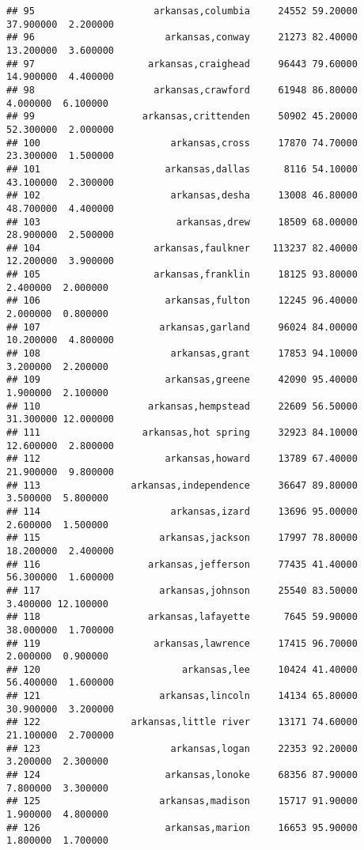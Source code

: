 \documentclass[
]{article}
\begin{document}
\begin{verbatim}
## 95                     arkansas,columbia     24552 59.20000 37.900000  2.200000
## 96                       arkansas,conway     21273 82.40000 13.200000  3.600000
## 97                    arkansas,craighead     96443 79.60000 14.900000  4.400000
## 98                     arkansas,crawford     61948 86.80000  4.000000  6.100000
## 99                   arkansas,crittenden     50902 45.20000 52.300000  2.000000
## 100                       arkansas,cross     17870 74.70000 23.300000  1.500000
## 101                      arkansas,dallas      8116 54.10000 43.100000  2.300000
## 102                       arkansas,desha     13008 46.80000 48.700000  4.400000
## 103                        arkansas,drew     18509 68.00000 28.900000  2.500000
## 104                    arkansas,faulkner    113237 82.40000 12.200000  3.900000
## 105                    arkansas,franklin     18125 93.80000  2.400000  2.000000
## 106                      arkansas,fulton     12245 96.40000  2.000000  0.800000
## 107                     arkansas,garland     96024 84.00000 10.200000  4.800000
## 108                       arkansas,grant     17853 94.10000  3.200000  2.200000
## 109                      arkansas,greene     42090 95.40000  1.900000  2.100000
## 110                   arkansas,hempstead     22609 56.50000 31.300000 12.000000
## 111                  arkansas,hot spring     32923 84.10000 12.600000  2.800000
## 112                      arkansas,howard     13789 67.40000 21.900000  9.800000
## 113                arkansas,independence     36647 89.80000  3.500000  5.800000
## 114                       arkansas,izard     13696 95.00000  2.600000  1.500000
## 115                     arkansas,jackson     17997 78.80000 18.200000  2.400000
## 116                   arkansas,jefferson     77435 41.40000 56.300000  1.600000
## 117                     arkansas,johnson     25540 83.50000  3.400000 12.100000
## 118                   arkansas,lafayette      7645 59.90000 38.000000  1.700000
## 119                    arkansas,lawrence     17415 96.70000  2.000000  0.900000
## 120                         arkansas,lee     10424 41.40000 56.400000  1.600000
## 121                     arkansas,lincoln     14134 65.80000 30.900000  3.200000
## 122                arkansas,little river     13171 74.60000 21.100000  2.700000
## 123                       arkansas,logan     22353 92.20000  3.200000  2.300000
## 124                      arkansas,lonoke     68356 87.90000  7.800000  3.300000
## 125                     arkansas,madison     15717 91.90000  1.900000  4.800000
## 126                      arkansas,marion     16653 95.90000  1.800000  1.700000

\end{verbatim}
\end{document}
